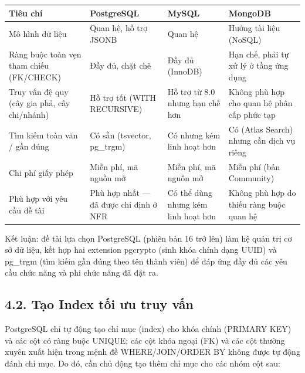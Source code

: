 \renewcommand{\arraystretch}{1.3}
\setlength{\tabcolsep}{3pt}

\begin{small}
	\begin{longtable}{|>{\raggedright\arraybackslash}p{2.5cm}|>{\raggedright\arraybackslash}p{3.6cm}|>{\raggedright\arraybackslash}p{3.6cm}|>{\raggedright\arraybackslash}p{3.8cm}|}
		\hline
		\textbf{Tiêu chí} & \textbf{PostgreSQL} & \textbf{MySQL} & \textbf{MongoDB} \\ \hline
		\endhead
		\hline
		\endfoot
		
		Mô hình dữ liệu & Quan hệ, hỗ trợ JSONB & Quan hệ & Hướng tài liệu (NoSQL) \\ \hline
		Ràng buộc toàn vẹn tham chiếu (FK/CHECK) & Đầy đủ, chặt chẽ & Đầy đủ (InnoDB) & Hạn chế, phải tự xử lý ở tầng ứng dụng \\ \hline
		Truy vấn đệ quy (cây gia phả, cây chi/nhánh) & Hỗ trợ tốt (WITH RECURSIVE) & Hỗ trợ từ 8.0 nhưng hạn chế hơn & Không phù hợp cho quan hệ phân cấp phức tạp \\ \hline
		Tìm kiếm toàn văn / gần đúng & Có sẵn (tsvector, pg\_trgm) & Có nhưng kém linh hoạt hơn & Có (Atlas Search) nhưng cần dịch vụ riêng \\ \hline
		Chi phí giấy phép & Miễn phí, mã nguồn mở & Miễn phí, mã nguồn mở & Miễn phí (bản Community) \\ \hline
		Phù hợp với yêu cầu đề tài & Phù hợp nhất --- đã được chỉ định ở NFR & Có thể dùng nhưng kém linh hoạt hơn & Không phù hợp do thiếu ràng buộc quan hệ \\ \hline
	\end{longtable}
\end{small}

Kết luận: đề tài lựa chọn PostgreSQL (phiên bản 16 trở lên) làm hệ quản trị cơ sở dữ liệu, kết hợp hai extension pgcrypto (sinh khóa chính dạng UUID) và pg\_trgm (tìm kiếm gần đúng theo tên thành viên) để đáp ứng đầy đủ các yêu cầu chức năng và phi chức năng đã đặt ra.

\subsection{4.2. Tạo Index tối ưu truy vấn}
\label{sec:tao_index}

PostgreSQL chỉ tự động tạo chỉ mục (index) cho khóa chính (PRIMARY KEY) và các cột có ràng buộc UNIQUE; các cột khóa ngoại (FK) và các cột thường xuyên xuất hiện trong mệnh đề WHERE/JOIN/ORDER BY không được tự động đánh chỉ mục. Do đó, cần chủ động tạo thêm chỉ mục cho các nhóm cột sau:

